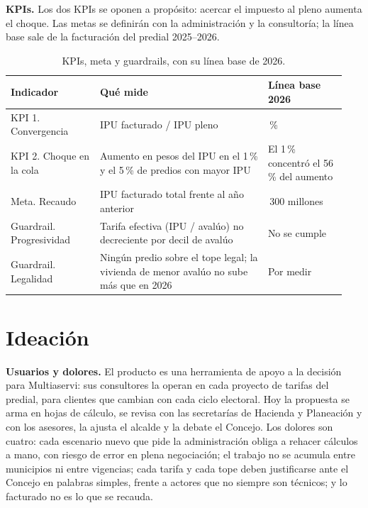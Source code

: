 \documentclass[12pt,letterpaper]{article}
\begin{document}
\textbf{KPIs.} Los dos KPIs se oponen a propósito: acercar el impuesto al pleno aumenta el choque.
Las metas se definirán con la administración y la consultoría; la línea base sale de la
facturación del predial 2025--2026.

\begin{table}[ht]
  \centering
  \caption{KPIs, meta y guardrails, con su línea base de 2026.}
  \label{tab:kpis}
  \begin{tabular}{@{}>{\raggedright\arraybackslash}p{0.25\linewidth}
                     >{\raggedright\arraybackslash}p{0.47\linewidth}
                     >{\raggedright\arraybackslash}p{0.22\linewidth}@{}}
    \toprule
    Indicador & Qué mide & Línea base 2026 \\
    \midrule
    KPI 1. Convergencia & IPU facturado / IPU pleno & 50\,\% \\
    KPI 2. Choque en la cola & Aumento en pesos del IPU en el 1\,\% y el 5\,\% de
      predios con mayor IPU & El 1\,\% concentró el 56\,\% del aumento \\
    Meta. Recaudo & IPU facturado total frente al año anterior & 68\,300 millones \\
    Guardrail. Progresividad & Tarifa efectiva (IPU / avalúo) no decreciente por decil
      de avalúo & No se cumple \\
    Guardrail. Legalidad & Ningún predio sobre el tope legal; la vivienda de menor
      avalúo no sube más que en 2026 & Por medir \\
    \bottomrule
  \end{tabular}
\end{table}

\section{Ideación} %
\textbf{Usuarios y dolores.} El producto es una herramienta de apoyo a la decisión para
Multiaservi: sus consultores la operan en cada proyecto de tarifas del predial, para
clientes que cambian con cada ciclo electoral. Hoy la propuesta se arma en hojas de
cálculo, se revisa con las secretarías de Hacienda y Planeación y con los asesores, la
ajusta el alcalde y la debate el Concejo. Los dolores son cuatro: cada escenario nuevo
que pide la administración obliga a rehacer cálculos a mano, con riesgo de error en
plena negociación; el trabajo no se acumula entre municipios ni entre vigencias; cada
tarifa y cada tope deben justificarse ante el Concejo en palabras simples, frente a
actores que no siempre son técnicos; y lo facturado no es lo que se recauda.
\end{document}
